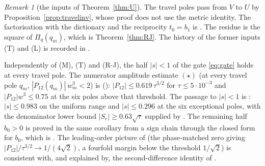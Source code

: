 \documentclass[11pt]{article}
\theoremstyle{plain}
\theoremstyle{definition}
\theoremstyle{remark}
\newtheorem{remark}[theorem]{Remark}
\theoremstyle{plain}\newtheorem*{maintheorem}{Main Theorem}
\begin{document}
\begin{remark}[the inputs of Theorem~\ref{thm:U}]\label{rem:Uinputs}
The travel poles pass from $V$ to $U$ by Proposition~\ref{prop:travelinv}, whose proof does not use
the metric identity. The factorisation {\cite[\textup{(eq:mobius)}]{Bonfioli2026bB}} with the dictionary {\cite[\textup{(eq:dict)}]{Bonfioli2026bB}} and
the reciprocity $t_0=b_1$ is {\cite[Theorem ``the bulk dictionary at the travel poles'', \textup{thm:L}]{Bonfioli2026bB}}. The residue is the square of $\Pi_q(q_m)$, which
is Theorem~\ref{thm:RJ}. The history of the former inputs \textup{(T)} and \textup{(L)} is
recorded in \cite[\S\S\,\textup{sec:inputT}--\textup{sec:inputL}]{Bonfioli2026bB}.

Independently of \textup{(M)}, \textup{(T)} and \textup{(R-J)}, the half
$|s|<1$ of the gate \eqref{eq:gate} holds at every travel pole. The numerator amplitude estimate
$(\star)$ (at every travel pole
$q_m$, $|P_{12}(q_m)|\,w_m^3<2$) is {\cite[Theorem ``the amplitude estimate $(\star)$'', \textup{thm:star}]{Bonfioli2026bB}} ({\cite[Appendix \textup{app:star}]{Bonfioli2026bB}}):
$|P_{12}|\le0.619\,\tau^{3/2}$ for $\tau\le5\cdot10^{-3}$ and $|P_{12}|w^3\le0.75$ at the six
poles above that threshold. The passage to $|s|<1$ is
{\cite[Corollary ``the gate closes'', \textup{app:gate}]{Bonfioli2026bB}}: $|s|\le0.983$ on the uniform range and $|s|\le0.296$ at the six
exceptional poles, with the denominator lower bound $|S_e|\ge0.63\sqrt\tau$ supplied by
{\cite[Lemma ``the denominator at the pole'', \textup{app:Se}]{Bonfioli2026bB}}. The remaining half $b_0>0$ is proved in the same corollary from a sign chain
through the closed form for $b_0$, which is {\cite[Corollary ``the dictionary'', \textup{cor:dict}]{Bonfioli2026bB}}. The
leading-order picture of {\cite[Remark ``derivation of the $U$-numerator amplitude'', \textup{rem:elemY3}]{Bonfioli2026bB}} (the phase-matched zero giving
$|P_{12}|/\tau^{3/2}\to1/(4\sqrt2)$, a fourfold margin below the threshold $1/\sqrt2$) is
consistent with, and explained by, the second-difference identity of
{\cite[Proposition \textup{prop:P12second}]{Bonfioli2026bB}}.
\end{remark}
\end{document}
